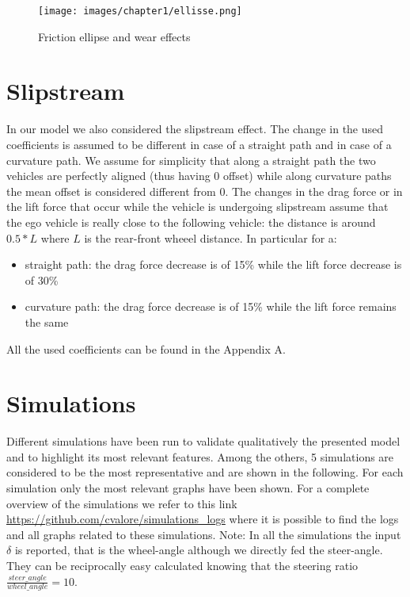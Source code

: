 \documentclass{report}
\let\Oldsection\section
\renewcommand{\section}{\FloatBarrier\Oldsection}
\begin{document}
\begin{figure}[h!]
    \centering
    \texttt{[image: images/chapter1/ellisse.png]}
    \caption{Friction ellipse and wear effects}
    \label{fig:ellisse}
\end{figure}

\newpage

\section{Slipstream}
In our model we also considered the slipstream effect.
The change in the used coefficients is assumed to be different in case of a straight path and in case of a curvature path. We assume for simplicity that along a straight path the two vehicles are perfectly aligned (thus having 0 offset) while along curvature paths the mean offset is considered different from 0. The changes in the drag force or in the lift force that occur while the vehicle is undergoing slipstream assume that the ego vehicle is really close to the following vehicle: the distance is around $0.5*L$ where $L$ is the rear-front wheeel distance. In particular for a:
\begin{itemize}
 \item straight path: the drag force decrease is of 15\% while the lift force decrease is of 30\% 
 \item curvature path: the drag force decrease is of 15\% while the lift force remains the same 
 \end{itemize}
 All the used coefficients can be found in the Appendix A. 

\section{Simulations}
Different simulations have been run to validate qualitatively the presented model and to highlight its most relevant features. Among the others, 5 simulations are considered to be the most representative and are shown in the following. For each simulation only the most relevant graphs have been shown. For a complete overview of the simulations we refer to this link \url{https://github.com/cvalore/simulations\_logs} where it is possible to find the logs and all graphs related to these simulations.
Note: In all the simulations the input $\delta$ is reported, that is the wheel-angle although we directly fed the steer-angle. They can be reciprocally easy calculated knowing that the steering ratio $\frac{steer\_angle}{wheel\_angle} = 10$.
\end{document}
